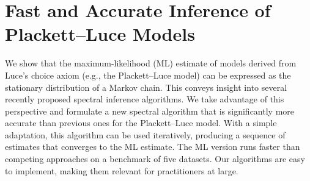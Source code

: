\chapter{Fast and Accurate Inference of Plackett--Luce Models}

We show that the maximum-likelihood (ML) estimate of models derived from Luce's choice axiom (e.g., the Plackett--Luce model) can be expressed as the stationary distribution of a Markov chain.
This conveys insight into several recently proposed spectral inference algorithms.
We take advantage of this perspective and formulate a new spectral algorithm that is significantly more accurate than previous ones for the Plackett--Luce model.
With a simple adaptation, this algorithm can be used iteratively, producing a sequence of estimates that converges to the ML estimate.
The ML version runs faster than competing approaches on a benchmark of five datasets.
Our algorithms are easy to implement, making them relevant for practitioners at large.









